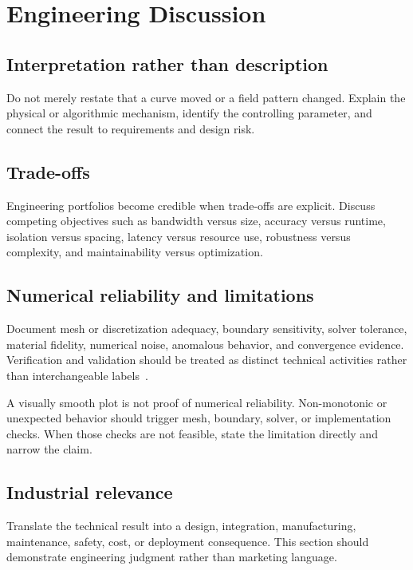 \chapter{Engineering Discussion}

\section{Interpretation rather than description}
Do not merely restate that a curve moved or a field pattern changed. Explain the
physical or algorithmic mechanism, identify the controlling parameter, and connect the
result to requirements and design risk.

\section{Trade-offs}
Engineering portfolios become credible when trade-offs are explicit. Discuss competing
objectives such as bandwidth versus size, accuracy versus runtime, isolation versus
spacing, latency versus resource use, robustness versus complexity, and maintainability
versus optimization.

\section{Numerical reliability and limitations}
Document mesh or discretization adequacy, boundary sensitivity, solver tolerance,
material fidelity, numerical noise, anomalous behavior, and convergence evidence. Verification and validation should be treated as distinct technical activities rather than interchangeable labels~\cite{oberkampf2010,asmev20}.

\begin{limitationbox}
A visually smooth plot is not proof of numerical reliability. Non-monotonic or
unexpected behavior should trigger mesh, boundary, solver, or implementation checks.
When those checks are not feasible, state the limitation directly and narrow the claim.
\end{limitationbox}

\section{Industrial relevance}
Translate the technical result into a design, integration, manufacturing, maintenance,
safety, cost, or deployment consequence. This section should demonstrate engineering
judgment rather than marketing language.
